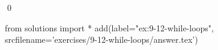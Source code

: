 
\begin{ex}
  \label{ex:9-12-while-loops}
  
  \qed
\end{ex}
\begin{python0}
from solutions import *
add(label="ex:9-12-while-loops",
    srcfilename='exercises/9-12-while-loops/answer.tex')
\end{python0}
